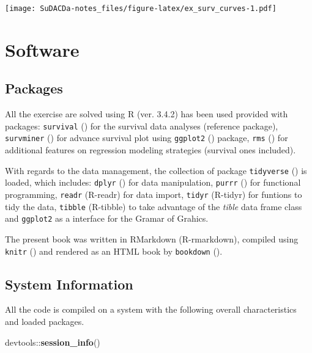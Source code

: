 \documentclass[]{book}
\newenvironment{Shaded}{\begin{snugshade}}{\end{snugshade}}
\newcommand{\KeywordTok}[1]{\textcolor[rgb]{0.13,0.29,0.53}{\textbf{{#1}}}}
\newcommand{\NormalTok}[1]{{#1}}
\theoremstyle{definition}
\theoremstyle{definition}
\theoremstyle{definition}
\theoremstyle{remark}
\begin{document}
\texttt{[image: SuDACDa-notes\_files/figure-latex/ex\_surv\_curves-1.pdf]}

\chapter*{Software}\label{software}

\section*{Packages}\label{packages}

All the exercise are solved using R (ver. 3.4.2) has been used provided
with packages: \texttt{survival} (\citet{R-survival}) for the survival
data analyses (reference package), \texttt{survminer}
(\citet{R-survminer}) for advance survival plot using \texttt{ggplot2}
(\citet{R-ggplot2}) package, \texttt{rms} (\citet{R-rms}) for additional
features on regression modeling strategies (survival ones included).

With regards to the data management, the collection of package
\texttt{tidyverse} (\citet{R-tidyverse}) is loaded, which includes:
\texttt{dplyr} (\citet{R-dplyr}) for data manipulation, \texttt{purrr}
(\citet{R-purrr}) for functional programming, \texttt{readr} (R-readr)
for data import, \texttt{tidyr} (R-tidyr) for funtions to tidy the data,
\texttt{tibble} (R-tibble) to take advantage of the \emph{tible} data
frame class and \texttt{ggplot2} as a interface for the Gramar of
Grahics.

The present book was written in RMarkdown (R-rmarkdown), compiled using
\texttt{knitr} (\citet{R-knitr}) and rendered as an HTML book by
\texttt{bookdown} (\citet{R-bookdown}).

\section*{System Information}\label{system-information}

All the code is compiled on a system with the following overall
characteristics and loaded packages.

\begin{Shaded}
\begin{Highlighting}[]
\NormalTok{devtools::}\KeywordTok{session_info}\NormalTok{()}
\end{Highlighting}
\end{Shaded}
\end{document}
